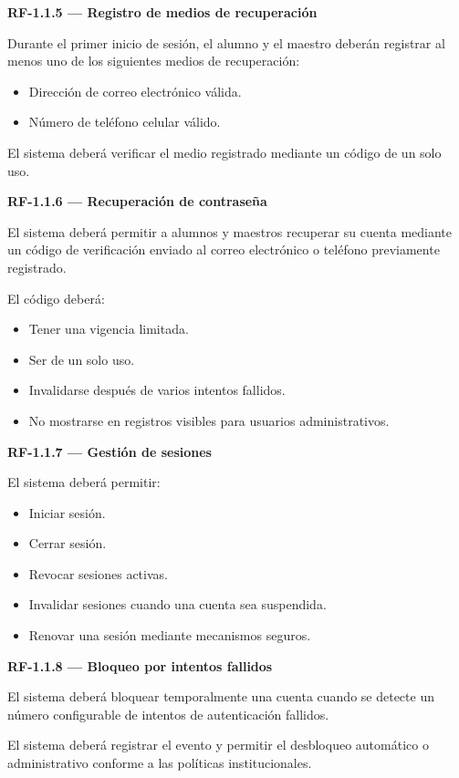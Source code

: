 \documentclass[12pt,a4paper]{article}
\newcommand{\RF}[1]{\textbf{\color{primary}RF-#1}}
\newenvironment{requisito}[1]
{
\begin{center}
\begin{minipage}{0.96\textwidth}
\colorbox{requirement}{
\begin{minipage}{0.94\textwidth}
\textbf{#1}
\end{minipage}
}
\vspace{2mm}
}
{
\end{minipage}
\end{center}
}
\begin{document}
\begin{requisito}{\RF{1.1.5} --- Registro de medios de recuperación}
Durante el primer inicio de sesión, el alumno y el maestro deberán registrar al
menos uno de los siguientes medios de recuperación:

\begin{itemize}[leftmargin=*]
\item Dirección de correo electrónico válida.
\item Número de teléfono celular válido.
\end{itemize}

El sistema deberá verificar el medio registrado mediante un código de un solo uso.
\end{requisito}

\begin{requisito}{\RF{1.1.6} --- Recuperación de contraseña}
El sistema deberá permitir a alumnos y maestros recuperar su cuenta mediante un
código de verificación enviado al correo electrónico o teléfono previamente
registrado.

El código deberá:

\begin{itemize}[leftmargin=*]
\item Tener una vigencia limitada.
\item Ser de un solo uso.
\item Invalidarse después de varios intentos fallidos.
\item No mostrarse en registros visibles para usuarios administrativos.
\end{itemize}
\end{requisito}

\begin{requisito}{\RF{1.1.7} --- Gestión de sesiones}
El sistema deberá permitir:

\begin{itemize}[leftmargin=*]
\item Iniciar sesión.
\item Cerrar sesión.
\item Revocar sesiones activas.
\item Invalidar sesiones cuando una cuenta sea suspendida.
\item Renovar una sesión mediante mecanismos seguros.
\end{itemize}
\end{requisito}

\begin{requisito}{\RF{1.1.8} --- Bloqueo por intentos fallidos}
El sistema deberá bloquear temporalmente una cuenta cuando se detecte un número
configurable de intentos de autenticación fallidos.

El sistema deberá registrar el evento y permitir el desbloqueo automático o
administrativo conforme a las políticas institucionales.
\end{requisito}
\end{document}
